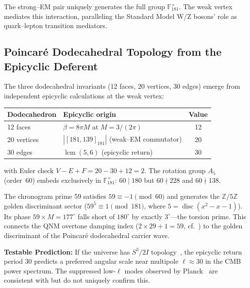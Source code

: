 The strong--EM pair uniquely generates the full group $\mathbb{F}_{181}^{\times}$. The weak vertex mediates this interaction, paralleling the Standard Model W/Z bosons' role as quark--lepton transition mediators.

\subsection{Poincar\'{e} Dodecahedral Topology from the Epicyclic Deferent}

The three dodecahedral invariants (12 faces, 20 vertices, 30 edges) emerge from independent epicyclic calculations at the weak vertex:
\begin{center}
\begin{tabular}{llc}
\hline
Dodecahedron & Epicyclic origin & Value \\
\hline
12 faces & $\beta = 8\pi M$ at $M = 3/(2\pi)$ & 12 \\
20 vertices & $|[181,139]_{181}|$ (weak--EM commutator) & 20 \\
30 edges & $\operatorname{lcm}(5, 6)$ (epicyclic return) & 30 \\
\hline
\end{tabular}
\end{center}
with Euler check $V - E + F = 20 - 30 + 12 = 2$. The rotation group $A_5$ (order~60) embeds exclusively in $\mathbb{F}_{181}^{\times}$: $60 \mid 180$ but $60 \nmid 228$ and $60 \nmid 138$.

The chronogram prime 59 satisfies $59 \equiv -1 \pmod{60}$ and generates the $\mathbb{Z}/5\mathbb{Z}$ golden discriminant sector ($59^5 \equiv 1 \pmod{181}$, where $5 = \operatorname{disc}(x^2 - x - 1)$). Its phase $59 \times M = 177^{\circ}$ falls short of $180^{\circ}$ by exactly $3^{\circ}$---the torsion prime. This connects the QNM overtone damping index ($2 \times 29 + 1 = 59$, cf.~\cite{hod1998, motl2003}) to the golden discriminant of the Poincar\'{e} dodecahedral carrier wave.

\textbf{Testable Prediction:} If the universe has $S^3/2I$ topology~\cite{luminet2003}, the epicyclic return period 30 predicts a preferred angular scale near multipole $\ell \approx 30$ in the CMB power spectrum. The suppressed low-$\ell$ modes observed by Planck~\cite{planck2020} are consistent with but do not uniquely confirm this.

